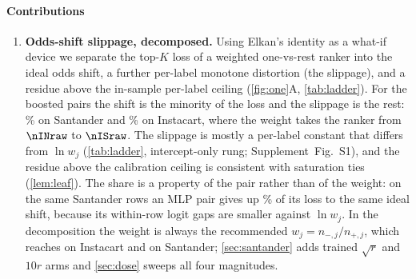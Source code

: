 \documentclass[sigconf,nonacm]{acmart}
\newcommand{\Supp}[1]{Supplement~#1}  %
\begin{document}
\paragraph{Contributions}
\begin{enumerate}[leftmargin=*,nosep]
\item \textbf{Odds-shift slippage, decomposed.} Using Elkan's identity as a what-if device we separate the top-$K$ loss of a weighted one-vs-rest ranker into the ideal odds shift, a further per-label monotone distortion (the slippage), and a residue above the in-sample per-label ceiling (\cref{fig:one}A, \cref{tab:ladder}). For the boosted pairs the shift is the minority of the loss and the slippage is the rest: \noddsShare\% on Santander and \nIoddsShare\% on Instacart, where the weight takes the ranker from $\nINraw$ to $\nISraw$. The slippage is mostly a per-label constant that differs from $\ln w_j$ (\cref{tab:ladder}, intercept-only rung; \Supp{Fig.~S1}), and the residue above the calibration ceiling is consistent with saturation ties (\cref{lem:leaf}). The share is a property of the pair rather than of the weight: on the same Santander rows an MLP pair gives up \nModdsShare\% of its loss to the same ideal shift, because its within-row logit gaps are smaller against $\ln w_j$. In the decomposition the weight is always the recommended $w_j=n_{-,j}/n_{+,j}$, which reaches \nIwMax{} on Instacart and \nwMax{} on Santander; \cref{sec:santander} adds trained $\sqrt{r}$ and $10r$ arms and \cref{sec:dose} sweeps all four magnitudes.

\end{enumerate}
\end{document}
